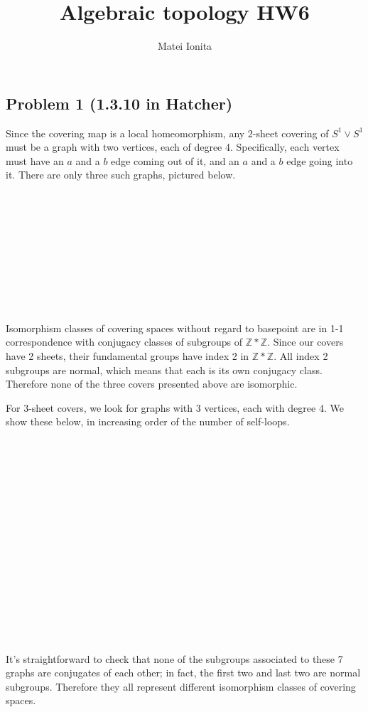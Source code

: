 \documentclass[12 pt]{article}
\title{Algebraic topology HW6}
\author{Matei Ionita}
\newcommand{\Z}{\mathbb{Z}}
\begin{document}
  \maketitle

\subsection*{Problem 1 (1.3.10 in Hatcher)}
Since the covering map is a local homeomorphism, any 2-sheet covering of $S^1 \vee S^1$ must be a graph with two 
vertices, each of degree 4. Specifically, each vertex must have an $a$ and a $b$ edge coming out of it, and an $a$ 
and a $b$ edge going into it. There are only three such graphs, pictured below.
\\
\\
\\
\\
\\
\\
\\
\\
\\
\\
\\
Isomorphism classes of covering spaces without regard to basepoint are in 1-1 correspondence with conjugacy 
classes of subgroups of $\Z * \Z$. Since our covers have 2 sheets, their fundamental groups have index 2 in 
$\Z * \Z$. All index 2 subgroups are normal, which means that each is its own conjugacy class. Therefore none 
of the three covers presented above are isomorphic.

For 3-sheet covers, we look for graphs with 3 vertices, each with degree 4. We show these below, in increasing 
order of the number of self-loops.
\\
\\
\\
\\
\\
\\
\\
\\
\\
\\
\\
\\
\\
\\
\\
\\
\\
It's straightforward to check that none of the subgroups associated to these 7 graphs are conjugates of each
other; in fact, the first two and last two are normal subgroups. Therefore they all represent different isomorphism
classes of covering spaces.
\end{document}
